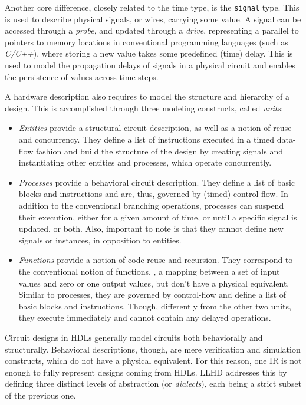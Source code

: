 Another core difference, closely related to the time type, is the \texttt{signal} type. This is used to describe physical signals, or wires, carrying some value. A signal can be accessed through a \textit{probe}, and updated through a \textit{drive}, representing a parallel to pointers to memory locations in conventional programming languages (such as \textit{C/C++}), where storing a new value takes some predefined (time) delay. This is used to model the propagation delays of signals in a physical circuit and enables the persistence of values across time steps.

A hardware description also requires to model the structure and hierarchy of a design. This is accomplished through three modeling constructs, called \textit{units}:
\begin{itemize}
    \item \textit{Entities} provide a structural circuit description, as well as a notion of reuse and concurrency. They define a list of instructions executed in a timed data-flow fashion and build the structure of the design by creating signals and instantiating other entities and processes, which operate concurrently.
    \item \textit{Processes} provide a behavioral circuit description. They define a list of basic blocks and instructions and are, thus, governed by (timed) control-flow. In addition to the conventional branching operations, processes can suspend their execution, either for a given amount of time, or until a specific signal is updated, or both. Also, important to note is that they cannot define new signals or instances, in opposition to entities.
    \item \textit{Functions} provide a notion of code reuse and recursion. They correspond to the conventional notion of functions, \ie, a mapping between a set of input values and zero or one output values, but don’t have a physical equivalent. Similar to processes, they are governed by control-flow and define a list of basic blocks and instructions. Though, differently from the other two units, they execute immediately and cannot contain any delayed operations.
\end{itemize}


Circuit designs in HDLs generally model circuits both behaviorally and structurally. Behavioral descriptions, though, are mere verification and simulation constructs, which do not have a physical equivalent. For this reason, one IR is not enough to fully represent designs coming from HDLs. LLHD addresses this by defining three distinct levels of abstraction (or \textit{dialects}), each being a strict subset of the previous one.

